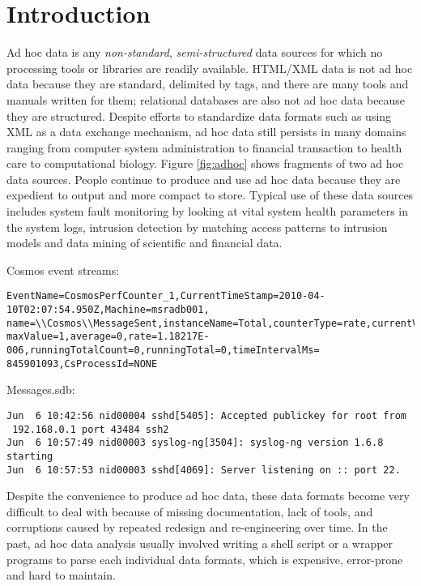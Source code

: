 \section{Introduction}
Ad hoc data is any {\em non-standard}, {\em semi-structured} 
data sources for which no processing tools or libraries are 
readily available. HTML/XML data is not ad hoc data because 
they are standard, delimited by tags, and there
are many tools and manuals written for them; relational databases 
are also not ad hoc data because they are structured. 
Despite efforts to standardize data formats such as using XML 
as a data exchange mechanism, ad hoc data still persists
in many domains ranging from computer system administration to 
financial transaction to health care to computational biology. Figure 
\ref{fig:adhoc} shows fragments of two ad hoc data sources.
People continue to produce and use ad hoc data because they 
are expedient to output and more compact to store.  
Typical use of these data sources includes system fault monitoring
by looking at vital system health parameters in the system logs,
intrusion detection by matching access patterns to intrusion
models and data mining of scientific and financial data.

\begin{figure*}
Cosmos event streams:
{\small
\begin{verbatim}
EventName=CosmosPerfCounter_1,CurrentTimeStamp=2010-04-10T02:07:54.950Z,Machine=msradb001,
name=\\Cosmos\\MessageSent,instanceName=Total,counterType=rate,currentValue=1,minValue=1,
maxValue=1,average=0,rate=1.18217E-006,runningTotalCount=0,runningTotal=0,timeIntervalMs=
845901093,CsProcessId=NONE
\end{verbatim}
}
Messages.sdb:
{\small
\begin{verbatim}
Jun  6 10:42:56 nid00004 sshd[5405]: Accepted publickey for root from 
 192.168.0.1 port 43484 ssh2
Jun  6 10:57:49 nid00003 syslog-ng[3504]: syslog-ng version 1.6.8 starting
Jun  6 10:57:53 nid00003 sshd[4069]: Server listening on :: port 22.
\end{verbatim}
}
\caption{Example ad hoc data sources}\label{fig:adhoc}
\end{figure*}

Despite the convenience to produce ad hoc data, these
data formats become very difficult to deal with because of missing
documentation, lack of tools, and corruptions caused by
repeated redesign and re-engineering over time. 
In the past, ad hoc data analysis usually involved
writing a shell script or a wrapper programs to parse each 
individual data formats, which is expensive, error-prone and 
hard to maintain. 

